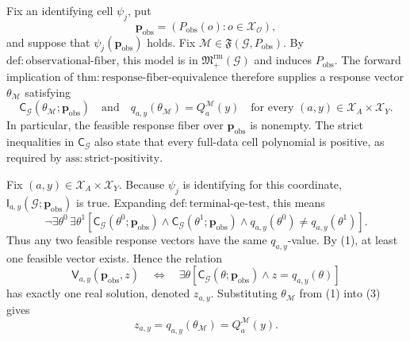 Fix an identifying cell \(\psi_j\), put
\[
\mathbf p_{\mathrm{obs}}=(P_{\mathrm{obs}}(o):o\in\mathcal X_{\mathcal O}),
\]
and suppose that \(\psi_j(\mathbf p_{\mathrm{obs}})\) holds.  Fix
\(\mathcal M\in\mathfrak F(\mathcal G,P_{\mathrm{obs}})\).  By
\(\mathrm{def{:}observational\text{-}fiber}\), this model is in
\(\mathfrak M_{+}^{\mathrm{rm}}(\mathcal G)\) and induces
\(P_{\mathrm{obs}}\).  The forward implication of
\(\mathrm{thm{:}response\text{-}fiber\text{-}equivalence}\) therefore supplies a response vector
\(\theta_{\mathcal M}\) satisfying
\[
\mathsf C_{\mathcal G}(\theta_{\mathcal M};\mathbf p_{\mathrm{obs}})
\quad\text{and}\quad
q_{a,y}(\theta_{\mathcal M})=Q_a^{\mathcal M}(y)
\quad
\text{for every }(a,y)\in\mathcal X_A\times\mathcal X_Y.
\tag{1}
\]
In particular, the feasible response fiber over \(\mathbf p_{\mathrm{obs}}\) is nonempty.  The strict inequalities in
\(\mathsf C_{\mathcal G}\) also state that every full-data cell polynomial is positive, as required by
\(\mathrm{ass{:}strict\text{-}positivity}\).

Fix \((a,y)\in\mathcal X_A\times\mathcal X_Y\).  Because \(\psi_j\) is identifying for this coordinate,
\(\mathsf I_{a,y}(\mathcal G;\mathbf p_{\mathrm{obs}})\) is true.  Expanding
\(\mathrm{def{:}terminal\text{-}qe\text{-}test}\), this means
\[
\neg\exists\theta^0\,\exists\theta^1
\left[
\mathsf C_{\mathcal G}(\theta^0;\mathbf p_{\mathrm{obs}})
\wedge
\mathsf C_{\mathcal G}(\theta^1;\mathbf p_{\mathrm{obs}})
\wedge
q_{a,y}(\theta^0)\ne q_{a,y}(\theta^1)
\right].
\tag{2}
\]
Thus any two feasible response vectors have the same \(q_{a,y}\)-value.  By (1), at least one feasible vector exists.  Hence the relation
\[
\mathsf V_{a,y}(\mathbf p_{\mathrm{obs}},z)
\quad\Longleftrightarrow\quad
\exists\theta\left[
\mathsf C_{\mathcal G}(\theta;\mathbf p_{\mathrm{obs}})
\wedge z=q_{a,y}(\theta)
\right]
\tag{3}
\]
has exactly one real solution, denoted \(z_{a,y}\).  Substituting \(\theta_{\mathcal M}\) from (1) into (3) gives
\[
z_{a,y}=q_{a,y}(\theta_{\mathcal M})=Q_a^{\mathcal M}(y).
\tag{4}
\]

